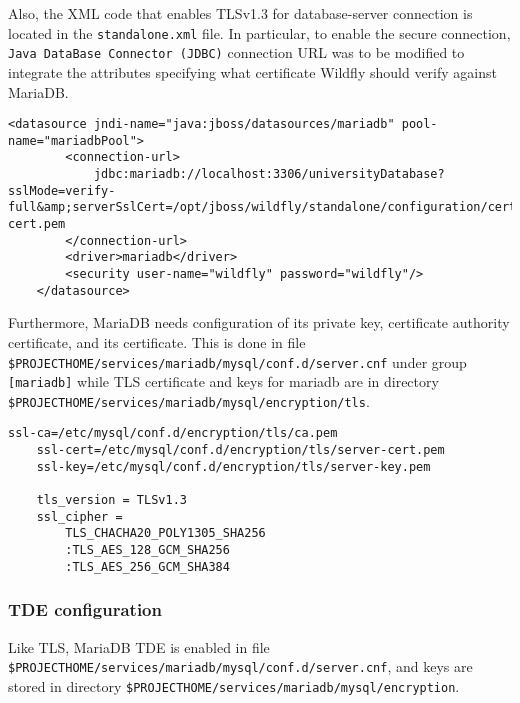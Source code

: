 Also, the XML code that enables TLSv1.3 for database-server connection is located in the \texttt{standalone.xml} file.
In particular, to enable the secure connection, \texttt{Java DataBase Connector (JDBC)} connection URL was to be modified to integrate the attributes specifying what certificate Wildfly should verify against MariaDB\cite{online:TlsJdbc}.

\begin{lstlisting}[style=XMLStyle]
    <datasource jndi-name="java:jboss/datasources/mariadb" pool-name="mariadbPool">
        <connection-url>
            jdbc:mariadb://localhost:3306/universityDatabase?sslMode=verify-full&amp;serverSslCert=/opt/jboss/wildfly/standalone/configuration/certificates/server-cert.pem
        </connection-url>
        <driver>mariadb</driver>
        <security user-name="wildfly" password="wildfly"/>
    </datasource>
\end{lstlisting}

Furthermore, MariaDB needs configuration of its private key, certificate authority certificate, and its certificate. This is done in file \\\texttt{\$PROJECT\textunderscore HOME/services/mariadb/mysql/conf.d/server.cnf} under group \texttt{[mariadb]} while TLS certificate and keys for mariadb are in directory \texttt{\$PROJECT\textunderscore HOME/services/mariadb/mysql/encryption/tls}.

\begin{lstlisting}[style=XMLStyle]
    ssl-ca=/etc/mysql/conf.d/encryption/tls/ca.pem
    ssl-cert=/etc/mysql/conf.d/encryption/tls/server-cert.pem
    ssl-key=/etc/mysql/conf.d/encryption/tls/server-key.pem
    
    tls_version = TLSv1.3
    ssl_cipher = 
        TLS_CHACHA20_POLY1305_SHA256
        :TLS_AES_128_GCM_SHA256
        :TLS_AES_256_GCM_SHA384
\end{lstlisting}

\subsubsection{TDE configuration}

Like TLS, MariaDB TDE is enabled in file \texttt{\$PROJECT\textunderscore HOME/services/mariadb/mysql/conf.d/server.cnf}, and keys are stored in directory \texttt{\$PROJECT\textunderscore HOME/services/mariadb/mysql/encryption}.

